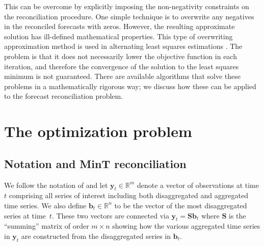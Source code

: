 \documentclass[11pt]{article}
\newcommand{\0}{\phantom{0}}
\begin{document}
This can be overcome by explicitly imposing the non-negativity constraints on the reconciliation procedure. One simple technique is to overwrite any negatives in the reconciled forecasts with zeros. However, the resulting approximate solution has ill-defined mathematical properties. This type of overwriting approximation method is used in alternating least squares estimations \citep{Berry2007, Karjalainen1991}. The problem is that it does not necessarily lower the objective function in each iteration, and therefore the convergence of the solution to the least squares minimum is not guaranteed. There are available algorithms that solve these problems in a mathematically rigorous way; we discuss how these can be applied to the forecast reconciliation problem.


\section{The optimization problem}

\subsection{Notation and MinT reconciliation}

We follow the notation of \citet{Wick2018} and let $\bm{y}_t \in \mathbb{R}^m$ denote a vector of observations at time $t$ comprising all series of interest including both disaggregated and aggregated time series. We also define $\bm{b}_t \in \mathbb{R}^n$ to be the vector of the most disaggregated series at time~$t$. These two vectors are connected via $\bm{y}_t=\bm{S}\bm{b}_t$ where $\bm{S}$ is the ``summing'' matrix of order $m \times n$ showing how the various aggregated time series in $\bm{y}_t$ are constructed from the disaggregated series in $\bm{b}_t$.
\end{document}
